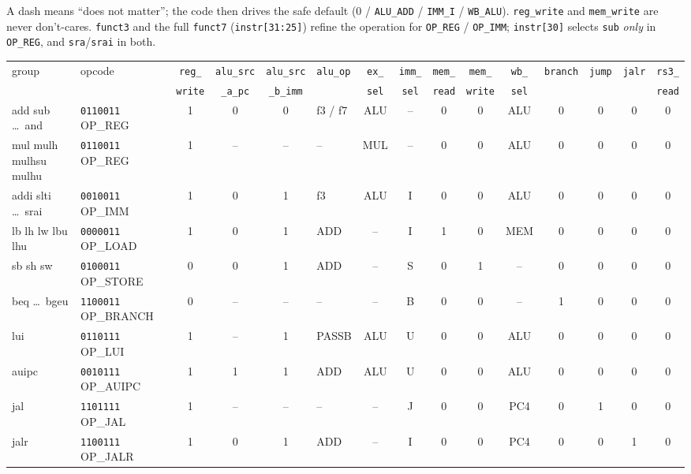 \documentclass[10pt]{article}
\newcommand{\sv}[1]{\texttt{#1}}
\begin{document}
\smallskip
\noindent A dash means ``does not matter''; the code then drives the safe default (0 / \sv{ALU\_ADD} / \sv{IMM\_I} / \sv{WB\_ALU}).
\sv{reg\_write} and \sv{mem\_write} are never don't-cares. \sv{funct3} and the full \sv{funct7} (\sv{instr[31:25]}) refine the
operation for \sv{OP\_REG} / \sv{OP\_IMM}; \sv{instr[30]} selects \sv{sub} \emph{only} in \sv{OP\_REG}, and \sv{sra}/\sv{srai} in both.

\medskip
\begin{center}
\small
\begin{tabular}{l l c c c l c c c c c c c c c}
\toprule
group & opcode & \sv{reg\_} & \sv{alu\_src} & \sv{alu\_src} & \sv{alu\_op} & \sv{ex\_} & \sv{imm\_} & \sv{mem\_} & \sv{mem\_} & \sv{wb\_} & \sv{branch} & \sv{jump} & \sv{jalr} & \sv{rs3\_}\\
      &        & \sv{write} & \sv{\_a\_pc} & \sv{\_b\_imm} &        & \sv{sel} & \sv{sel}  & \sv{read} & \sv{write} & \sv{sel} &  &  & & \sv{read}\\
\midrule
add sub \dots\ and      & \sv{0110011} OP\_REG    & 1 & 0 & 0 & f3 / f7  & ALU & --  & 0 & 0 & ALU & 0 & 0 & 0 & 0\\
mul mulh mulhsu mulhu   & \sv{0110011} OP\_REG    & 1 & --& --& --       & MUL & --  & 0 & 0 & ALU & 0 & 0 & 0 & 0\\
addi slti \dots\ srai   & \sv{0010011} OP\_IMM    & 1 & 0 & 1 & f3       & ALU & I   & 0 & 0 & ALU & 0 & 0 & 0 & 0\\
lb lh lw lbu lhu        & \sv{0000011} OP\_LOAD   & 1 & 0 & 1 & ADD      & --  & I   & 1 & 0 & MEM & 0 & 0 & 0 & 0\\
sb sh sw                & \sv{0100011} OP\_STORE  & 0 & 0 & 1 & ADD      & --  & S   & 0 & 1 & --  & 0 & 0 & 0 & 0\\
beq \dots\ bgeu         & \sv{1100011} OP\_BRANCH & 0 & --& --& --       & --  & B   & 0 & 0 & --  & 1 & 0 & 0 & 0\\
lui                     & \sv{0110111} OP\_LUI    & 1 & --& 1 & PASSB    & ALU & U   & 0 & 0 & ALU & 0 & 0 & 0 & 0\\
auipc                   & \sv{0010111} OP\_AUIPC  & 1 & 1 & 1 & ADD      & ALU & U   & 0 & 0 & ALU & 0 & 0 & 0 & 0\\
jal                     & \sv{1101111} OP\_JAL    & 1 & --& --& --       & --  & J   & 0 & 0 & PC4 & 0 & 1 & 0 & 0\\
jalr                    & \sv{1100111} OP\_JALR   & 1 & 0 & 1 & ADD      & --  & I   & 0 & 0 & PC4 & 0 & 0 & 1 & 0\\

\end{tabular}
\end{center}
\end{document}
